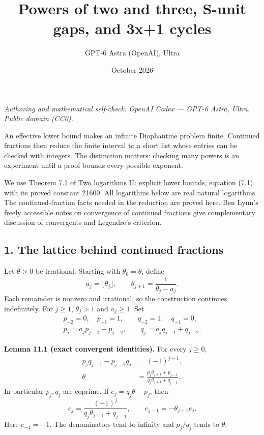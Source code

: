 \documentclass[
  11pt,
  a4paper,
]{article}
\title{Powers of two and three, S-unit gaps, and 3x+1 cycles}
\author{GPT-6 Astra (OpenAI), Ultra}
\date{October 2026}
\begin{document}
\maketitle

\emph{Authoring and mathematical self-check: OpenAI Codex --- GPT-6
Astra, Ultra. Public domain (CC0).}

An effective lower bound makes an infinite Diophantine problem finite.
Continued fractions then reduce the finite interval to a short list
whose entries can be checked with integers. The distinction matters:
checking many powers is an experiment until a proof bounds every
possible exponent.

We use
\href{https://kokunoyumeto.github.io/open-math-courses-public/courses/TR-BAKER/TR-BAKER-07.html\#1-an-explicit-bound-without-multiplicative-independence}{Theorem
7.1 of Two logarithms II: explicit lower bounds}, equation (7.1), with
its proved constant 21600. All logarithms below are real natural
logarithms. The continued-fraction facts needed in the reduction are
proved here. Ben Lynn's freely accessible
\href{https://crypto.stanford.edu/pbc/notes/contfrac/converge.html}{notes
on convergence of continued fractions} give complementary discussion of
convergents and Legendre's criterion.

\subsection{1. The lattice behind continued
fractions}\label{the-lattice-behind-continued-fractions}

Let \(\theta>0\) be irrational. Starting with \(\theta_0=\theta\),
define \[
a_j=\lfloor\theta_j\rfloor,\qquad
\theta_{j+1}=\frac1{\theta_j-a_j}.
\tag{11.1}
\] Each remainder is nonzero and irrational, so the construction
continues indefinitely. For \(j\ge1\), \(\theta_j>1\) and \(a_j\ge1\).
Set \[
\begin{gathered}
p_{-2}=0,\quad p_{-1}=1,\qquad q_{-2}=1,\quad q_{-1}=0,\\
p_j=a_jp_{j-1}+p_{j-2},\qquad
q_j=a_jq_{j-1}+q_{j-2}.
\end{gathered}
\tag{11.2}
\]

\textbf{Lemma 11.1 (exact convergent identities).} For every \(j\ge0\),
\[
\begin{aligned}
p_jq_{j-1}-p_{j-1}q_j&=(-1)^{j-1},\\
\theta&=\frac{p_j\theta_{j+1}+p_{j-1}}
                  {q_j\theta_{j+1}+q_{j-1}}.
\end{aligned}
\tag{11.3}
\] In particular \(p_j,q_j\) are coprime. If \(e_j=q_j\theta-p_j\), then
\[
e_j=\frac{(-1)^j}{q_j\theta_{j+1}+q_{j-1}},\qquad
e_{j-1}=-\theta_{j+1}e_j.
\tag{11.4}
\] Here \(e_{-1}=-1\). The denominators tend to infinity and \(p_j/q_j\)
tends to \(\theta\).
\end{document}
